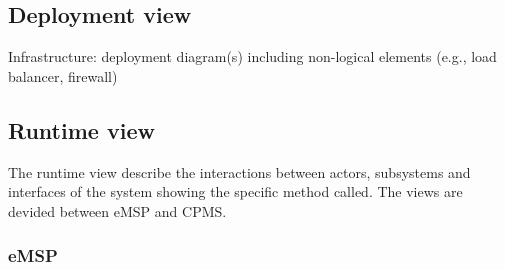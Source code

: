 \subsection{Deployment view}
Infrastructure: deployment diagram(s) including non-logical elements (e.g., load balancer, firewall)
\pagebreak
\subsection{Runtime view}
The runtime view describe the interactions between actors, subsystems and interfaces of the system showing the specific method called.
The views are devided between eMSP and CPMS.

\subsubsection{eMSP}
